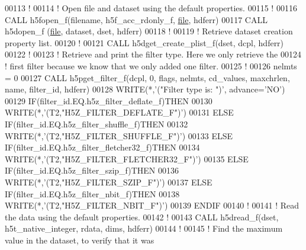 \begin{DoxyCode}
00113   \textcolor{comment}{!}
00114   \textcolor{comment}{! Open file and dataset using the default properties.}
00115   \textcolor{comment}{!}
00116   \textcolor{keyword}{CALL }h5fopen\_f(filename, h5f\_acc\_rdonly\_f, \hyperlink{structfile}{file}, hdferr)
00117   \textcolor{keyword}{CALL }h5dopen\_f (\hyperlink{structfile}{file}, dataset, dset, hdferr)
00118   \textcolor{comment}{!}
00119   \textcolor{comment}{! Retrieve dataset creation property list.}
00120   \textcolor{comment}{!}
00121   \textcolor{keyword}{CALL }h5dget\_create\_plist\_f(dset, dcpl, hdferr)
00122   \textcolor{comment}{!}
00123   \textcolor{comment}{! Retrieve and print the filter type.  Here we only retrieve the}
00124   \textcolor{comment}{! first filter because we know that we only added one filter.}
00125   \textcolor{comment}{!}
00126   nelmts = 0
00127   \textcolor{keyword}{CALL }h5pget\_filter\_f(dcpl, 0, flags, nelmts, cd\_values, maxchrlen, name, filter\_id, hdferr)
00128   \textcolor{keyword}{WRITE}(*,\textcolor{stringliteral}{'("Filter type is: ")'}, advance=\textcolor{stringliteral}{'NO'})
00129   \textcolor{keywordflow}{IF}(filter\_id.EQ.h5z\_filter\_deflate\_f)\textcolor{keywordflow}{THEN}
00130      \textcolor{keyword}{WRITE}(*,\textcolor{stringliteral}{'(T2,"H5Z\_FILTER\_DEFLATE\_F")'})
00131   \textcolor{keywordflow}{ELSE} \textcolor{keywordflow}{IF}(filter\_id.EQ.h5z\_filter\_shuffle\_f)\textcolor{keywordflow}{THEN}
00132      \textcolor{keyword}{WRITE}(*,\textcolor{stringliteral}{'(T2,"H5Z\_FILTER\_SHUFFLE\_F")'})
00133   \textcolor{keywordflow}{ELSE} \textcolor{keywordflow}{IF}(filter\_id.EQ.h5z\_filter\_fletcher32\_f)\textcolor{keywordflow}{THEN}
00134      \textcolor{keyword}{WRITE}(*,\textcolor{stringliteral}{'(T2,"H5Z\_FILTER\_FLETCHER32\_F")'})
00135   \textcolor{keywordflow}{ELSE} \textcolor{keywordflow}{IF}(filter\_id.EQ.h5z\_filter\_szip\_f)\textcolor{keywordflow}{THEN}
00136      \textcolor{keyword}{WRITE}(*,\textcolor{stringliteral}{'(T2,"H5Z\_FILTER\_SZIP\_F")'})
00137   \textcolor{keywordflow}{ELSE} \textcolor{keywordflow}{IF}(filter\_id.EQ.h5z\_filter\_nbit\_f)\textcolor{keywordflow}{THEN}
00138      \textcolor{keyword}{WRITE}(*,\textcolor{stringliteral}{'(T2,"H5Z\_FILTER\_NBIT\_F")'})
00139 \textcolor{keywordflow}{  ENDIF}
00140   \textcolor{comment}{!}
00141   \textcolor{comment}{! Read the data using the default properties.}
00142   \textcolor{comment}{!}
00143   \textcolor{keyword}{CALL }h5dread\_f(dset, h5t\_native\_integer, rdata, dims, hdferr)
00144   \textcolor{comment}{!}
00145   \textcolor{comment}{! Find the maximum value in the dataset, to verify that it was}

\end{DoxyCode}
